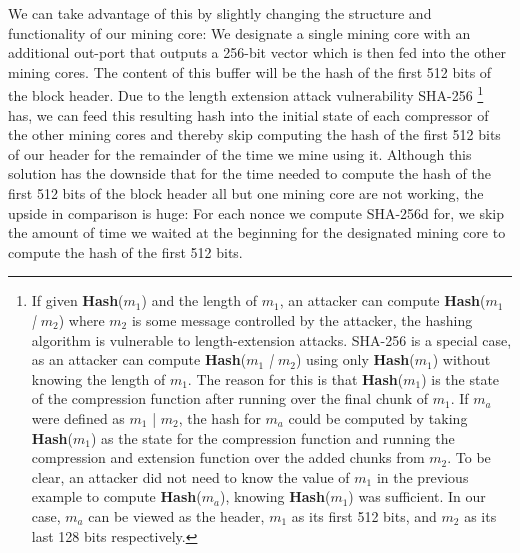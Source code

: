 We can take advantage of this by slightly changing the structure and functionality of our mining core: We designate a single mining core with an additional out-port that outputs a 256-bit vector which is then fed into the other mining cores. The content of this buffer will be the hash of the first 512 bits of the block header. Due to the length extension attack vulnerability SHA-256 \footnote{ If given \textbf{Hash}(\textit{$m_1$}) and the length of $m_1$, an attacker can compute \textbf{Hash}(\textit{$m_1$ | $m_2$}) where $m_2$ is some message controlled by the attacker, the hashing algorithm is vulnerable to length-extension attacks. SHA-256 is a special case, as an attacker can compute \textbf{Hash}(\textit{$m_1$ | $m_2$}) using only \textbf{Hash}(\textit{$m_1$}) without knowing the length of $m_1$. The reason for this is that  \textbf{Hash}(\textit{$m_1$}) is the state of the compression function after running over the final chunk of $m_1$. If $m_a$ were defined as $m_1$ | $m_2$, the hash for $m_a$ could be computed by taking \textbf{Hash}(\textit{$m_1$}) as the state for the compression function and running the compression and extension function over the added chunks from $m_2$. To be clear, an attacker did not need to know the value of $m_1$ in the previous example to compute \textbf{Hash}(\textit{$m_a$}), knowing \textbf{Hash}(\textit{$m_1$}) was sufficient. In our case, $m_a$ can be viewed as the header, $m_1$ as its first 512 bits, and $m_2$ as its last 128 bits respectively. }
 has, we can feed this resulting hash into the initial state of each compressor of the other mining cores and thereby skip computing the hash of the first 512 bits of our header for the remainder of the time we mine using it. Although this solution has the downside that for the time needed to compute the hash of the first 512 bits of the block header all but one mining core are not working, the upside in comparison is huge: For each nonce we compute SHA-256d for, we skip the amount of time we waited at the beginning for the designated mining core to compute the hash of the first 512 bits.

